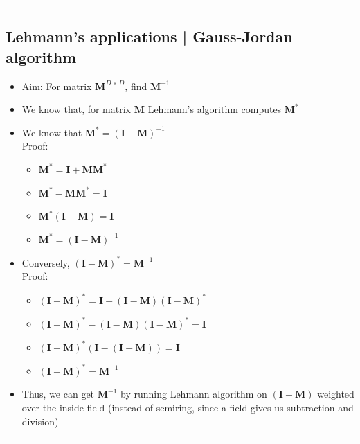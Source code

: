 {\color{black}\hrule height 0.001mm}

\subsection*{Lehmann's applications | Gauss-Jordan algorithm}
\begin{itemize}
    \item Aim: For matrix $\boldsymbol{M}^{D \times D}$, find $\boldsymbol{M}^{-1}$
    \item We know that, for matrix $\boldsymbol{M}$ Lehmann's algorithm computes $\boldsymbol{M}^*$
    \item We know that $\boldsymbol{M}^* = (\boldsymbol{I}-\boldsymbol{M})^{-1}$\\
    Proof:
    \begin{itemize}
        \item $
        \mathbf{M}^* = \mathbf{I} + \mathbf{M} \mathbf{M}^*
        $
        \item $
        \mathbf{M}^* - \mathbf{M} \mathbf{M}^* = \mathbf{I}
        $
        \item $
        \mathbf{M}^* (\mathbf{I} - \mathbf{M}) = \mathbf{I}
        $
        \item $
        \mathbf{M}^* = (\mathbf{I} - \mathbf{M})^{-1}
        $
    \end{itemize}
    \item Conversely, $(\boldsymbol{I}-\boldsymbol{M})^* = \boldsymbol{M}^{-1}$\\
    Proof:
    \begin{itemize}
        \item $(\mathbf{I} - \mathbf{M})^* = \mathbf{I} + (\mathbf{I} - \mathbf{M})(\mathbf{I} - \mathbf{M})^*$
        \item $(\mathbf{I} - \mathbf{M})^* - (\mathbf{I} - \mathbf{M})(\mathbf{I} - \mathbf{M})^* = \mathbf{I}$
        \item $(\mathbf{I} - \mathbf{M})^* (\mathbf{I} - (\mathbf{I} - \mathbf{M})) = \mathbf{I}$
        \item $(\mathbf{I} - \mathbf{M})^* = \mathbf{M}^{-1}$
    \end{itemize}
    \item Thus, we can get $\mathbf{M}^{-1}$ by running Lehmann algorithm on $(\mathbf{I} - \mathbf{M})$ weighted over the inside field (instead of semiring, since a field gives us subtraction and division)
\end{itemize}

{\color{black}\hrule height 0.001mm}


